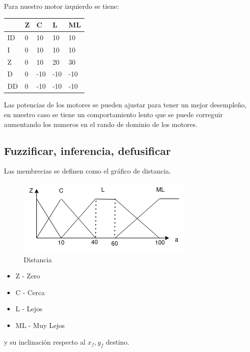 \documentclass[oneside,onecolumn]{article}
\begin{document}
Para nuestro motor izquierdo se tiene:
\begin{table}[h]
\centering
\begin{tabular}{l|l|l|l|l|}
\cline{2-5}
                         & Z & C   & L   & ML  \\ \hline
\multicolumn{1}{|l|}{ID} & 0 & 10 & 10 & 10 \\ \hline
\multicolumn{1}{|l|}{I}  & 0 & 10 & 10 & 10 \\ \hline
\multicolumn{1}{|l|}{Z}  & 0 & 10  & 20  & 30  \\ \hline
\multicolumn{1}{|l|}{D}  & 0 & -10  & -10  & -10  \\ \hline
\multicolumn{1}{|l|}{DD} & 0 & -10  & -10  & -10  \\ \hline
\end{tabular}
\end{table}

Las potencias de los motores se pueden ajustar para tener un mejor desempleño, en nuestro caso se tiene un comportamiento lento que se puede correguir aumentando los numeros en el rando de dominio de los motores. 


\subsection{Fuzzificar, inferencia, defusificar}

Las membrecias se definen como el gráfico de distancia.

\begin{figure}[h]
  \centering
  \includegraphics[scale=0.7]{graficos/fuzzy_distancia.png}
  \caption{Distancia}
\end{figure}

\begin{itemize}
\item Z - Zero
\item C - Cerca
\item L - Lejos
\item ML - Muy Lejos
\end{itemize}

\newpage
y su inclinación respecto al $x_f,y_f$ destino.
\end{document}
